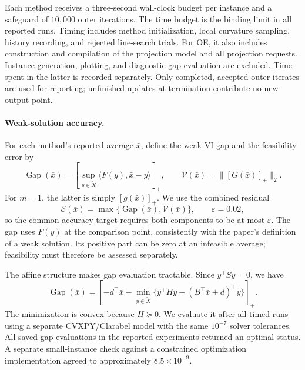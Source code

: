 Each method receives a three-second wall-clock budget per instance and a
safeguard of $10{,}000$ outer iterations. The time budget is the binding
limit in all reported runs. Timing
includes method initialization, local curvature sampling, history
recording, and rejected line-search trials. For OE, it also includes
construction and compilation of the projection model and all projection
requests. Instance generation, plotting, and diagnostic gap evaluation
are excluded. Time spent in the latter is recorded separately. Only
completed, accepted outer iterates are used for reporting; unfinished
updates at termination contribute no new output point.

\paragraph{Weak-solution accuracy.}
For each method's reported average $\bar x$, define the weak VI gap and
the feasibility error by
\begin{equation}\label{eq:numerical_accuracy_components}
\operatorname{Gap}(\bar x)=
\left[\sup_{y\in\widetilde X}
\langle F(y),\bar x-y\rangle\right]_+,
\qquad
\mathcal V(\bar x)=\|[G(\bar x)]_+\|_2.
\end{equation}
For $m=1$, the latter is simply $[g(\bar x)]_+$. We use the combined
residual
\begin{equation}\label{eq:numerical_combined_residual}
\mathcal E(\bar x)=
\max\{\operatorname{Gap}(\bar x),\mathcal V(\bar x)\},
\qquad \varepsilon=0.02,
\end{equation}
so the common accuracy target requires both components to be at most
$\varepsilon$. The gap uses $F(y)$ at the comparison point, consistently
with the paper's definition of a weak solution. Its positive part can be
zero at an infeasible average; feasibility must therefore be assessed
separately.

The affine structure makes gap evaluation tractable. Since $y^\top
Sy=0$, we have
\begin{equation}\label{eq:numerical_gap_program}
\operatorname{Gap}(\bar x)=
\left[-d^\top\bar x-
\min_{y\in\widetilde X}
\bigl\{y^\top Hy-(B^\top\bar x+d)^\top y\bigr\}\right]_+.
\end{equation}
The minimization is convex because $H\succeq0$. We evaluate it after
all timed runs using a separate CVXPY/\allowbreak Clarabel model with the same
$10^{-7}$ solver tolerances. All saved gap evaluations in the reported
experiments returned an optimal status. A separate small-instance check
against a constrained optimization implementation agreed to approximately
$8.5\times10^{-9}$.

